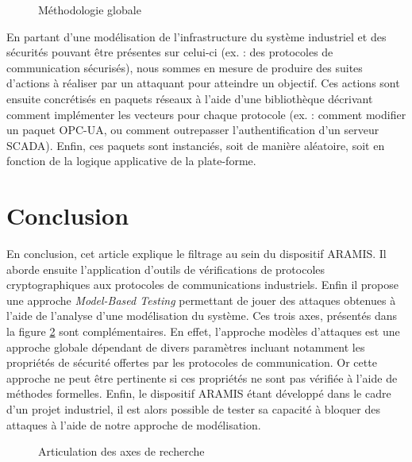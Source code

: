 \documentclass{article}
\newcommand{\ex}{ex. :\xspace}
\newcommand{\aramis}{ARAMIS\xspace}
\newcommand{\opcua}{OPC-UA\xspace}
\begin{document}
\begin{figure}[htb]
    \centering
    \resizebox{.75\textwidth}{!}{
        
    }
    \caption{Méthodologie globale}
    \label{fig:metho}
\end{figure}

En partant d'une modélisation de l'infrastructure du système industriel et des
sécurités pouvant être présentes sur celui-ci (\ex des protocoles de
communication sécurisés), nous sommes en mesure de produire des suites d'actions
à réaliser par un attaquant pour atteindre un objectif.
Ces actions sont ensuite concrétisés en paquets réseaux à l'aide d'une
bibliothèque décrivant comment implémenter les vecteurs 
pour chaque protocole (\ex comment modifier un paquet \opcua, ou comment
outrepasser l'authentification d'un serveur SCADA).
Enfin, ces paquets sont instanciés, soit de manière aléatoire, soit en fonction
de la logique applicative de la plate-forme.

\section{Conclusion}\label{sec:concl}

En conclusion, cet article explique le filtrage au sein du dispositif \aramis.
Il aborde ensuite l'application d'outils de vérifications de protocoles
cryptographiques aux protocoles de communications industriels.
Enfin il propose une approche {\em Model-Based Testing} permettant de jouer
des attaques obtenues à l'aide de l'analyse d'une modélisation du système.
Ces trois axes, présentés dans la figure \ref{fig:thesis} sont complémentaires.
En effet, l'approche modèles d'attaques est une approche globale dépendant de
divers paramètres incluant notamment les propriétés de sécurité offertes par les
protocoles de communication.
Or cette approche ne peut être pertinente si ces propriétés ne sont pas vérifiée
à l'aide de méthodes formelles.
Enfin, le dispositif \aramis étant développé dans le cadre d'un projet industriel,
il est alors possible de tester sa capacité à bloquer des attaques à l'aide
de notre approche de modélisation.

\begin{figure}[htb]
    \centering
    \resizebox{.85\textwidth}{!}{
        
    }
    \caption{Articulation des axes de recherche}
    \label{fig:thesis}
\end{figure}
\end{document}

